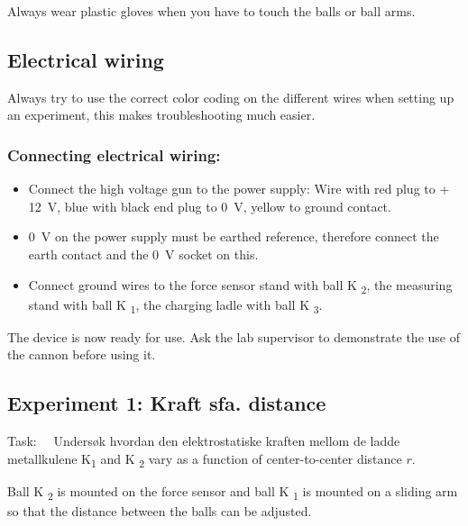 \documentclass[../Elmag-labhefte-2022.tex]{subfiles}
\begin{document}
\begin{itemize}
Always wear plastic gloves when you have to touch the balls or ball arms.


\subsection{Electrical wiring}
Always try to use the correct color coding on the different wires when setting up an experiment, this makes troubleshooting much easier.

\subsubsection{Connecting electrical wiring:}

\vspace{-4mm}
\begin{itemize}
    \item Connect the high voltage gun to the power supply: Wire with red plug to + \SI{12}{\volt}, blue with black end plug to \SI{0}{\volt}, yellow to ground contact.
    \item \SI{0}{\volt} on the power supply must be earthed reference, therefore connect the earth contact and the \SI{0}{\volt} socket on this.
    \item Connect ground wires to the force sensor stand with ball K \textsubscript{2}, the measuring stand with ball K \textsubscript{1}, the charging ladle with ball K \textsubscript{3}.
\end{itemize}

The device is now ready for use. Ask the lab supervisor to demonstrate the use of the cannon before using it.



\subsection{Experiment 1: Kraft sfa. distance}
 
Task: \ \
{\itsf Undersøk hvordan den elektrostatiske kraften mellom de ladde metallkulene K\textsubscript{1} and K \textsubscript{2} vary as a function of center-to-center distance $r$.
}

Ball K \textsubscript{2} is mounted on the force sensor and ball K \textsubscript{1} is mounted on a sliding arm so that the distance between the balls can be adjusted.



\end{itemize}
\end{document}
